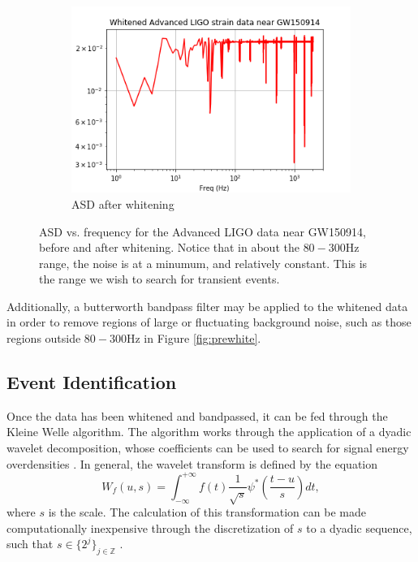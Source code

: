 \documentclass{article}
\begin{document}
\begin{figure}
\begin{subfigure}{\textwidth}
\includegraphics[width=\textwidth]{GW150914_white.png}
\caption{ASD after whitening}
\label{fig:postwhite}
\end{subfigure}
\caption{ASD vs. frequency for the Advanced LIGO data near GW150914, before and after whitening. Notice that in about the $80-300\mathrm{Hz}$ range, the noise is at a minumum, and relatively constant. This is the range we wish to search for transient events.}
\label{fig:asd}
\end{figure}

Additionally, a butterworth bandpass filter may be applied to the whitened data \cite{Blackburn2007}\cite{LIGOScientificCollaboration} in order to remove regions of large or fluctuating background noise, such as those regions outside $80-300\mathrm{Hz}$ in Figure \ref{fig:prewhite}.

\subsection{Event Identification}
Once the data has been whitened and bandpassed, it can be fed through the Kleine Welle algorithm. The algorithm works through the application of a dyadic wavelet decomposition, whose coefficients can be used to search for signal energy overdensities \cite{Biswas2013}\cite{Blackburn2007}. In general, the wavelet transform is defined by the equation \cite{Blackburn2007}\cite{Mallat1999}
\begin{equation}
W_{f}(u,s)=\int_{-\infty}^{+\infty}f(t)\frac{1}{\sqrt{s}}\psi^{*}\left(\frac{t-u}{s}\right)dt, \label{eq:wavtr}
\end{equation}
where $s$ is the scale. The calculation of this transformation can be made computationally inexpensive through the discretization of $s$ to a dyadic sequence, such that $s \in \{2^{j}\}_{j\in\mathbb{Z}}$ \cite{Blackburn2007}\cite{Mallat1999}.
\end{document}
